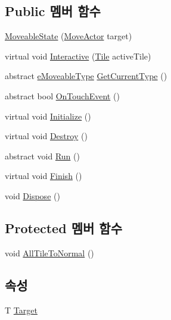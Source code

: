 \subsection*{Public 멤버 함수}
\begin{DoxyCompactItemize}
\item 
\hyperlink{class_move_actor_1_1_moveable_state_a8aabee832e31e33507bf93a2737f520c}{Moveable\+State} (\hyperlink{class_move_actor}{Move\+Actor} target)
\item 
virtual void \hyperlink{class_move_actor_1_1_moveable_state_a2e7b5112230caf5048b95cbdc6b96e34}{Interactive} (\hyperlink{class_tile}{Tile} active\+Tile)
\item 
abstract \hyperlink{_move_actor_8cs_a90215797ba850e199f3ef63d7c56f132}{e\+Moveable\+Type} \hyperlink{class_move_actor_1_1_moveable_state_a0333e87600aceebfe26602fd0c697447}{Get\+Current\+Type} ()
\item 
abstract bool \hyperlink{class_move_actor_1_1_moveable_state_a8e3934aae2ff2036e18a91b4d06ad7e3}{On\+Touch\+Event} ()
\item 
virtual void \hyperlink{class_m_c_n_1_1_state_a8eabaffe047e6dccd5c5d8aed7bf218a}{Initialize} ()
\item 
virtual void \hyperlink{class_m_c_n_1_1_state_a32af22a6a0a979d3b3a80225426aa839}{Destroy} ()
\item 
abstract void \hyperlink{class_m_c_n_1_1_state_a8adfea67c55997e5c0eefbae1e429f4d}{Run} ()
\item 
virtual void \hyperlink{class_m_c_n_1_1_state_a6de4f94b23916fcd05f589759da9ac3f}{Finish} ()
\item 
void \hyperlink{class_m_c_n_1_1_state_a6c53b2eda47e718ff469fd76a95cf02a}{Dispose} ()
\end{DoxyCompactItemize}
\subsection*{Protected 멤버 함수}
\begin{DoxyCompactItemize}
\item 
void \hyperlink{class_move_actor_1_1_moveable_state_a2da1a565b497b15a220f5ff494ec7a1e}{All\+Tile\+To\+Normal} ()
\end{DoxyCompactItemize}
\subsection*{속성}
\begin{DoxyCompactItemize}
\item 
T \hyperlink{class_m_c_n_1_1_state_a93ba2fd920292031bd6e65b1dc505cb3}{Target}
\end{DoxyCompactItemize}


